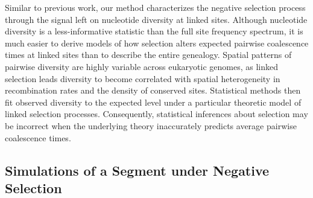 \documentclass[11pt]{article}
\begin{document}
Similar to previous work, our method characterizes the negative selection
process through the signal left on nucleotide diversity at linked sites.
Although nucleotide diversity is a less-informative statistic than the full
site frequency spectrum, it is much easier to derive models of how selection
alters expected pairwise coalescence times at linked sites than to describe the
entire genealogy. Spatial patterns of pairwise diversity are highly variable
across eukaryotic genomes, as linked selection leads diversity to become
correlated with spatial heterogeneity in recombination rates and the density of
conserved sites. Statistical methods then fit observed diversity to the
expected level under a particular theoretic model of linked selection
processes. Consequently, statistical inferences about selection may be
incorrect when the underlying theory inaccurately predicts average pairwise
coalescence times.

\subsection*{Simulations of a Segment under Negative Selection}
\end{document}
